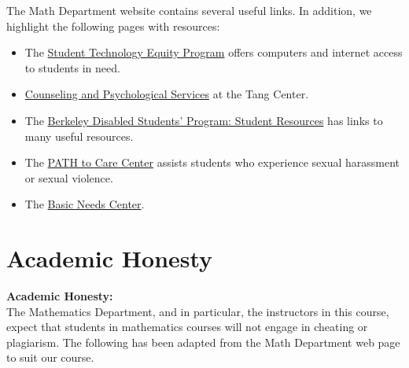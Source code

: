 \documentclass[11pt, a4paper]{article}
\begin{document}
The Math Department website contains several useful links. In addition, we highlight the following pages with resources:
\begin{itemize}
    \item The \href{https://technology.berkeley.edu/STEP}{Student Technology Equity Program} offers computers and internet access to students in need.
    \item \href{https://uhs.berkeley.edu/caps}{Counseling and Psychological Services} at the Tang Center.
    \item The \href{https://dsp.berkeley.edu/students/student-resources}{Berkeley Disabled Students' Program: Student Resources} has links to many useful resources.
    \item The \href{https://care.berkeley.edu/}{PATH to Care Center} assists students who experience sexual harassment or sexual violence.
    \item The \href{https://basicneeds.berkeley.edu/}{Basic Needs Center}.
\end{itemize}


\section*{Academic Honesty}
\noindent\textbf{Academic Honesty:} \\ 
The Mathematics Department, and in particular, the instructors in this course, expect that students in mathematics courses will not engage in cheating or plagiarism. The following has been adapted from the Math Department web page to suit our course. \\
\end{document}
